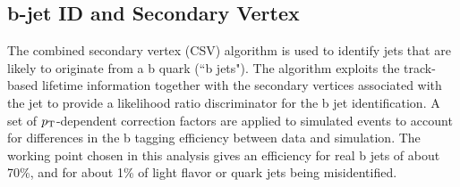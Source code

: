 \subsection{b-jet ID and Secondary Vertex}
The combined secondary vertex (CSV) algorithm is used to identify jets that are likely to originate from a b quark (``b jets"). The algorithm exploits the track-based lifetime information together with the secondary vertices associated with the jet to provide a likelihood ratio discriminator for the b jet identification. A set of $p_\mathrm{T}$-dependent correction
factors are applied to simulated events to account for differences in the b tagging efficiency
between data and simulation. The working point chosen in this analysis gives an efficiency for real b jets of about 70\%, and for about 1\% of light flavor or quark jets being misidentified.


